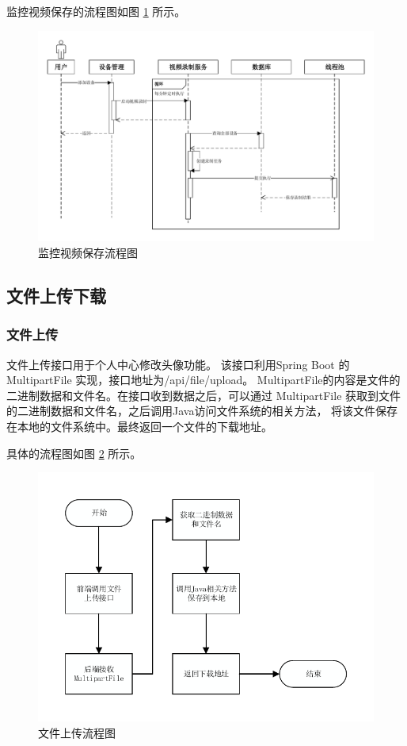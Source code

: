 监控视频保存的流程图如图 \ref{Fig:video_save} 所示。

\begin{figure}[ht]
    \centering
    \includegraphics[width=0.9\linewidth]{./Figure/IMG_video_save.pdf}
    \caption{监控视频保存流程图}\label{Fig:video_save}
\end{figure}

\subsection{文件上传下载}
\subsubsection{文件上传}
文件上传接口用于个人中心修改头像功能。
该接口利用Spring Boot 的 MultipartFile 实现，接口地址为/api/file/upload。
MultipartFile的内容是文件的二进制数据和文件名。在接口收到数据之后，可以通过 
MultipartFile 获取到文件的二进制数据和文件名，之后调用Java访问文件系统的相关方法，
将该文件保存在本地的文件系统中。最终返回一个文件的下载地址。


具体的流程图如图 \ref{Fig:seq_upload} 所示。

\begin{figure}[ht]
    \centering
    \includegraphics[width=0.7\linewidth]{./Figure/IMG_seq_upload.pdf}
    \caption{文件上传流程图}\label{Fig:seq_upload}
\end{figure}

